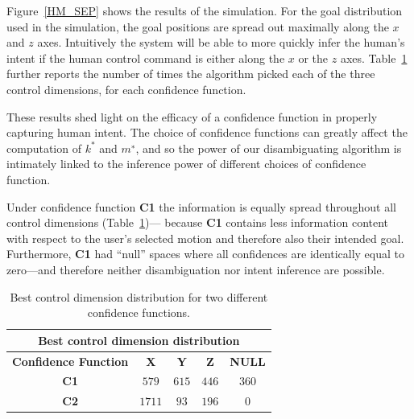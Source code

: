 \documentclass[conference]{IEEEtran}
\begin{document}
Figure~\ref{HM_SEP} shows the results of the simulation. For the goal
distribution used in the simulation, the goal positions are
spread out maximally along the $x$ and $z$ axes. Intuitively the
system will be able to more quickly infer the human’s intent if the
human control command is either along the $x$ or the $z$ axes. Table~\ref{HMD} further
reports the number of times the algorithm picked each of the
three control dimensions, for each confidence function.

These results shed light on the efficacy of a confidence
function in properly capturing human intent. The choice of confidence
functions can greatly affect the
computation of $k^*$ and $m^∗$, and so the power of our disambiguating
algorithm is intimately linked to the inference power of different
choices of confidence function.

Under confidence function \textbf{C1} the information is
equally spread throughout all control dimensions (Table~\ref{HMD})—
because \textbf{C1} contains less information content with respect to
the user’s selected motion and therefore also their intended
goal. Furthermore, \textbf{C1} had ``null'' spaces where all confidences
are identically equal to zero---and therefore neither disambiguation nor intent inference are possible.

\begin{table}[t]
	\centering
	\begin{tabular}{|c|c|c|c|c|}
		\hline
		\multicolumn{5}{|c|}{Best control dimension distribution} \\
		\hline
		\textbf{Confidence Function} & \textbf{X} & \textbf{Y} & \textbf{Z} & \textbf{NULL} \\ \hline
		
		\textbf{C1} & $579$ & $615$ & $446$ & $360$ \\ \hline
		\textbf{C2} & $1711$ & $93$ & $196$ & $0$\\ \hline
		
	\end{tabular}
	\vspace{.2cm}
	\caption{Best control dimension distribution for two different confidence functions.} 
	\label{HMD}
	\vspace{-.5cm}
\end{table}
\end{document}
